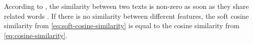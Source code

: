 According to \citeauthor{soft_cosine2017}, the similarity between two texts is non-zero as soon as they share related words \cite{soft_cosine2017}.
If there is no similarity between different features, 
the soft cosine similarity from \autoref{eq:soft-cosine-similarity} is equal to the cosine similarity from \autoref{eq:cosine-similarity}.
